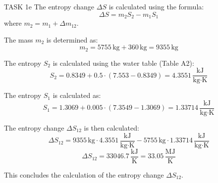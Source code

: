 TASK 1e  
The entropy change \( \Delta S \) is calculated using the formula:  
\[
\Delta S = m_2 S_2 - m_1 S_1
\]  
where \( m_2 = m_1 + \Delta m_{12} \).  

The mass \( m_2 \) is determined as:  
\[
m_2 = 5755 \, \text{kg} + 360 \, \text{kg} = 9355 \, \text{kg}
\]  

The entropy \( S_2 \) is calculated using the water table (Table A2):  
\[
S_2 = 0.8349 + 0.5 \cdot (7.553 - 0.8349) = 4.3551 \, \frac{\text{kJ}}{\text{kg·K}}
\]  

The entropy \( S_1 \) is calculated as:  
\[
S_1 = 1.3069 + 0.005 \cdot (7.3549 - 1.3069) = 1.33714 \, \frac{\text{kJ}}{\text{kg·K}}
\]  

The entropy change \( \Delta S_{12} \) is then calculated:  
\[
\Delta S_{12} = 9355 \, \text{kg} \cdot 4.3551 \, \frac{\text{kJ}}{\text{kg·K}} - 5755 \, \text{kg} \cdot 1.33714 \, \frac{\text{kJ}}{\text{kg·K}}
\]  
\[
\Delta S_{12} = 33046.7 \, \frac{\text{kJ}}{\text{K}} = 33.05 \, \frac{\text{MJ}}{\text{K}}
\]  

This concludes the calculation of the entropy change \( \Delta S_{12} \).